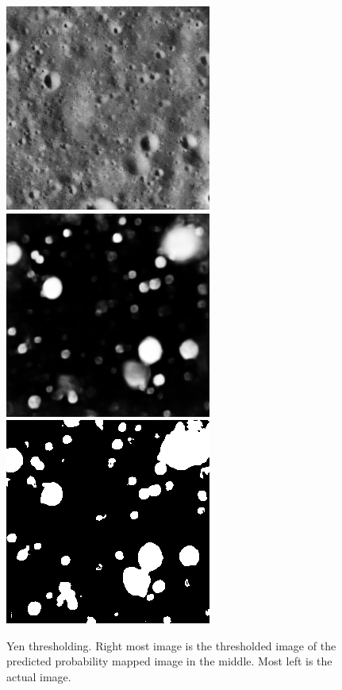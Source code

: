 \documentclass[11pt]{article}
\begin{document}
\begin{figure}[H]
	\includegraphics[width=.3\textwidth]{files/results/26.png}\hfill	
	\includegraphics[width=.3\textwidth]{files/results/26_predict.png}\hfill
	\includegraphics[width=.3\textwidth]{files/results/yen.png}\hfill
	\caption{Yen thresholding. Right most image is the thresholded image of the predicted probability mapped image in the middle. Most left is the actual image.}
	\label{Yen thresholding}
\end{figure}
\end{document}
